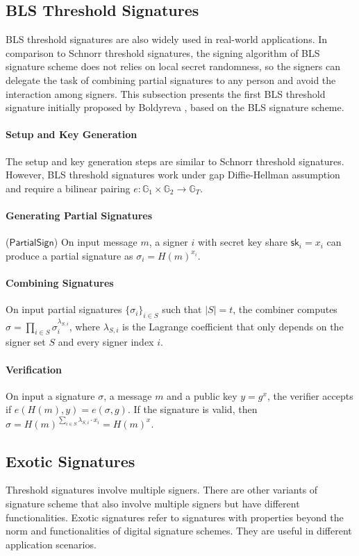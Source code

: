 \subsection{BLS Threshold Signatures}
BLS threshold signatures are also widely used in real-world applications. In comparison to Schnorr threshold signatures, the signing algorithm of BLS signature scheme does not relies on local secret randomness, so the signers can delegate the task of combining partial signatures to any person and avoid the interaction among signers. This subsection presents the first BLS threshold signature initially proposed by Boldyreva \cite{DBLP:conf/pkc/Boldyreva03}, based on the BLS signature scheme. 

\paragraph{Setup and Key Generation} The setup and key generation steps are similar to Schnorr threshold signatures. However, BLS threshold signatures work under gap Diffie-Hellman assumption and require a bilinear pairing $e:\mathbb{G}_1\times \mathbb{G}_2\to \mathbb{G}_T$. 

\paragraph{Generating Partial Signatures} ($\mathsf{PartialSign}$) On input message $m$, a signer $i$ with secret key share $\mathsf{sk}_i = x_i$ can produce a partial signature as $\sigma_i = H(m)^{x_i}$. 

\paragraph{Combining Signatures} On input partial signatures $\{\sigma_i\}_{i\in S}$ such that $|S|=t$, the combiner computes $\sigma = \prod_{i\in S} \sigma_i^{\lambda_{S, i}}$, where $\lambda_{S,i}$ is the Lagrange coefficient that only depends on the signer set $S$ and every signer index $i$. 

\paragraph{Verification} On input a signature $\sigma$, a message $m$ and a public key $y=g^x$, the verifier accepts if $e(H(m), y) = e(\sigma, g)$. If the signature is valid, then $\sigma = H(m)^{\sum_{i\in S} \lambda_{S, i} \cdot x_i} = H(m)^x$. 


\subsection{Exotic Signatures}
Threshold signatures involve multiple signers. There are other variants of signature scheme that also involve multiple signers but have different functionalities. Exotic signatures refer to signatures with properties beyond the norm and functionalities of digital signature schemes. They are useful in different application scenarios. 

